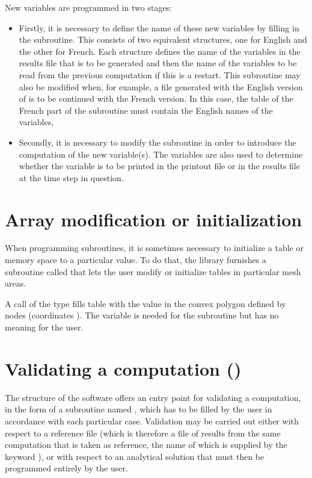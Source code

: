 New variables are programmed in two stages:

\begin{itemize}
\item Firstly, it is necessary to define the name of these new variables
by filling in the  subroutine.
This consists of two equivalent structures, one for English and the other
for French.
Each structure defines the name of the variables in the results file
that is to be generated and then the name of the variables to be read
from the previous computation if this is a restart.
This subroutine may also be modified when, for example, a file generated with
the English version of  is to be continued with the French version.
In this case, the  table of the French part of the subroutine
must contain the English names of the variables,

\item Secondly, it is necessary to modify the 
subroutine in order to introduce the computation of the new variable(s).
The variables  are also used to
determine whether the variable is to be printed in the printout file
or in the results file at the time step in question.
\end{itemize}


\section{Array modification or initialization}

When programming  subroutines, it is sometimes necessary to
initialize a table or memory space to a particular value.
To do that, the \bief library furnishes a subroutine called 
that lets the user modify or initialize tables in particular mesh areas.

A call of the type 
fills table  with the  value in the convex polygon
defined by  nodes (coordinates ).
The variable  is needed for the  subroutine
but has no meaning for the user.


\section{Validating a computation ()}

The structure of the  software offers an entry point for validating
a computation, in the form of a subroutine named ,
which has to be filled by the user in accordance with each particular case.
Validation may be carried out either with respect to a reference file
(which is therefore a file of results from the same computation that is taken
as reference, the name of which is supplied by the keyword
), or with respect to an analytical solution that must
then be programmed entirely by the user.


